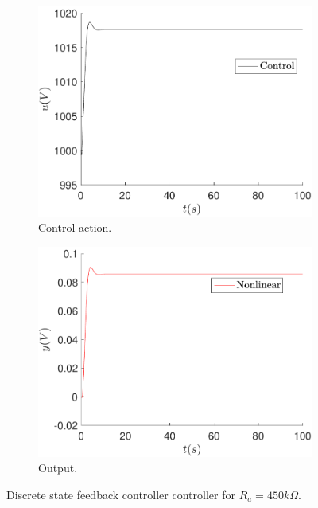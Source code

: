 	\begin{figure}
        \centering
        \begin{subfigure}[b]{0.475\textwidth}
            \centering
            \includegraphics[scale=0.425]{files/sens_analysis/Ref0/control_analysis_sfc_a_450.pdf}
            \caption{Control action.}
        \end{subfigure}
        \vskip0.1cm
        \begin{subfigure}[b]{0.475\textwidth}   
            \centering 
            \includegraphics[scale=0.425]{files/sens_analysis/Ref0/analysis_sfc_a_450.pdf}
            \caption{Output.}
        \end{subfigure}
        \caption{Discrete state feedback controller controller for $R_a=450k\Omega$.}
        \label{fig:sens_ra_450_state}
	\end{figure}
	
